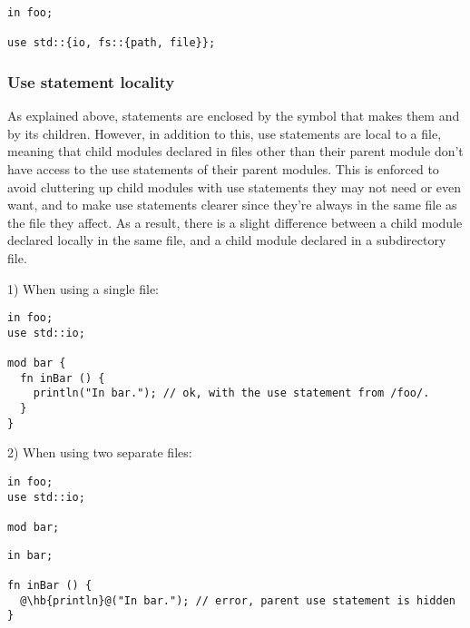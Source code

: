 \begin{lstlisting}[style=coloredverbatim]
in foo;

use std::{io, fs::{path, file}};
\end{lstlisting}

\subsubsection{Use statement locality}

As explained above,  statements are enclosed by the symbol that
makes them and by its children. However, in addition to this, use statements are
local to a file, meaning that child modules declared in files other than their
parent module don't have access to the use statements of their parent modules.
This is enforced to avoid cluttering up child modules with use statements they
may not need or even want, and to make use statements clearer since they're
always in the same file as the file they affect. As a result, there is a slight
difference between a child module declared locally in the same file, and a child
module declared in a subdirectory file.
\smallskip

1) When using a single file:

\begin{lstlisting}[caption=\textit{./foo.yr}, style=coloredverbatim]
in foo;
use std::io;

mod bar {
  fn inBar () {
    println("In bar."); // ok, with the use statement from /foo/.
  }
}
\end{lstlisting}

2) When using two separate files:

\hspace{-0.03\linewidth}%
\begin{minipage}[t][][t]{0.3\linewidth}%
\begin{lstlisting}[caption=\textit{./foo.yr}, style=coloredverbatim]
in foo;
use std::io;

mod bar;
\end{lstlisting}
\end{minipage}%
\hspace{0.02\linewidth}%
\begin{minipage}[t][][t]{0.65\linewidth}
\begin{lstlisting}[caption=\textit{./foo/bar.yr}, style=coloredverbatim, escapechar=@]
in bar;

fn inBar () {
  @\hb{println}@("In bar."); // error, parent use statement is hidden
}
\end{lstlisting}
\end{minipage}%
\smallskip


